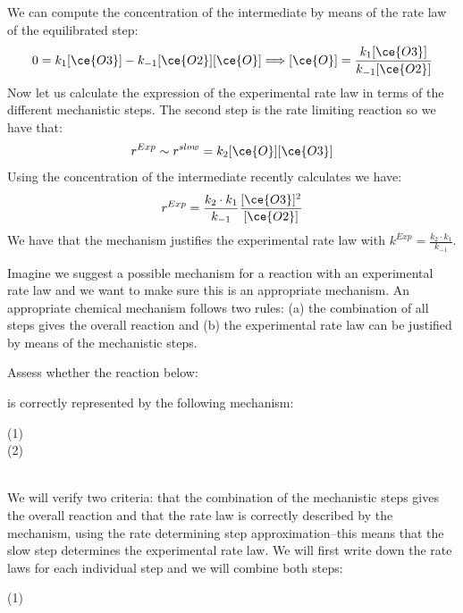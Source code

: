 \documentclass[main.tex]{subfiles}
\begin{document}
\begin{description}
We can compute the concentration of the intermediate by means of the rate law of the equilibrated step:
\[0=k_1[\ce{O3}]-k_{-1}[\ce{O2}][\ce{O}] \Longrightarrow	[\ce{O}]=\frac{k_1[\ce{O3}]}{k_{-1}[\ce{O2}]}\]
Now let us calculate the expression of the experimental rate law in terms of the different mechanistic steps. 
The second step is the rate limiting reaction so we have that:
 \[r^{Exp}\sim r^{slow}=k_2[\ce{O}][\ce{O3}]\]
Using the concentration of the intermediate recently calculates we have:
 \[r^{Exp}=\frac{k_2\cdot k_1}{k_{-1}}\frac{[\ce{O3}]^2}{[\ce{O2}]}\]
 We have that the mechanism justifies the experimental rate law with $k^{Exp}=\frac{k_2\cdot k_1}{k_{-1}}$.
 \item[\docfilehook{How to verify a possible mechanism }{}] 
Imagine we suggest a possible mechanism for a reaction with an experimental rate law and we want to make sure this is an appropriate mechanism. An appropriate chemical mechanism follows two rules: (a) the combination of all steps gives the overall reaction and (b) the experimental rate law can be justified by means of the mechanistic steps.
\begin{example} %
Assess whether the reaction below:
\begin{center} \end{center}
is correctly represented by the following mechanism:
\begin{center}
(1)\hfill{} \\
(2)\hfill{} 
\end{center}
\\
We will verify two criteria: that the combination of the mechanistic steps gives the overall reaction and that the rate law is correctly described by the mechanism, using the rate determining step approximation--this means that the slow step determines the experimental rate law. We will first write down the rate laws for each individual step and we will combine both steps:
\begin{center}
(1)\hfill{} \\

\end{center}
\end{example}
\end{description}
\end{document}
